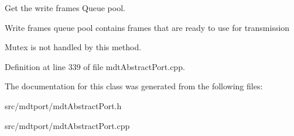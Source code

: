 Get the write frames Queue pool. 

Write frames queue pool contains frames that are ready to use for transmission

Mutex is not handled by this method. 

Definition at line 339 of file mdtAbstractPort.cpp.



The documentation for this class was generated from the following files:\begin{DoxyCompactItemize}
\item 
src/mdtport/mdtAbstractPort.h\item 
src/mdtport/mdtAbstractPort.cpp\end{DoxyCompactItemize}
